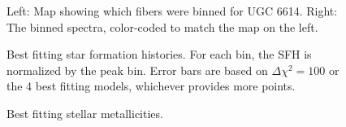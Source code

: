 \documentclass{emulateapj}
\begin{document}



\begin{figure}
\caption{Left:  Map showing which fibers were binned for UGC 6614.  Right:  The binned spectra, color-coded to match the map on the left. \label{ugc_binmap}}
\end{figure}




\begin{figure}
\caption{ Best fitting star formation histories.  For each bin, the SFH is normalized by the peak bin.  Error bars are based on $\Delta\chi^2=100$ or the 4 best fitting models, whichever provides more points.  \label{sfh_ugc} }
\end{figure}


\begin{figure}
\caption{Best fitting stellar metallicities.   \label{metal_ugc}}
\end{figure}
\end{document}

